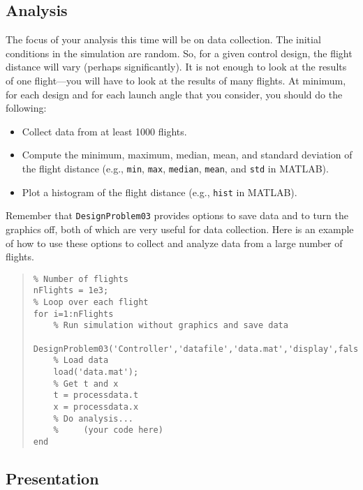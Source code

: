 \documentclass[12pt]{article}
\begin{document}
\subsection{Analysis}
\label{secAnalysis}

The focus of your analysis this time will be on data collection. The initial conditions in the simulation are random. So, for a given control design, the flight distance will vary (perhaps significantly). It is not enough to look at the results of one flight---you will have to look at the results of many flights. At minimum, for each design and for each launch angle that you consider, you should do the following:
\begin{itemize}
\item Collect data from at least 1000 flights.
\item Compute the minimum, maximum, median, mean, and standard deviation of the flight distance (e.g., \lstinline|min|, \lstinline|max|, \lstinline|median|, \lstinline|mean|, and \lstinline|std| in MATLAB).
\item Plot a histogram of the flight distance (e.g., \lstinline|hist| in MATLAB).
\end{itemize}
Remember that \lstinline|DesignProblem03| provides options to save data and to turn the graphics off, both of which are very useful for data collection. Here is an example of how to use these options to collect and analyze data from a large number of flights.
\begin{quote}
\begin{lstlisting}
% Number of flights
nFlights = 1e3;
% Loop over each flight
for i=1:nFlights
    % Run simulation without graphics and save data
    DesignProblem03('Controller','datafile','data.mat','display',false);
    % Load data
    load('data.mat');
    % Get t and x
    t = processdata.t
    x = processdata.x
    % Do analysis...
    %     (your code here)
end
\end{lstlisting}
\end{quote}


\subsection{Presentation}
\end{document}
